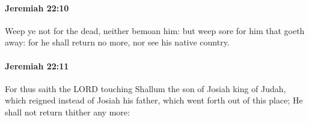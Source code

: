 		\paragraph{Jeremiah 22:10} %
			\label{JEREMIAH-22-10}

			Weep ye not for the dead, neither bemoan him: but weep sore for him that goeth away: for he shall return no more, nor see his native country.


		\paragraph{Jeremiah 22:11} %
			\label{JEREMIAH-22-11}

			For thus saith the LORD touching Shallum the son of Josiah king of Judah, which reigned instead of Josiah his father, which went forth out of this place; He shall not return thither any more:


